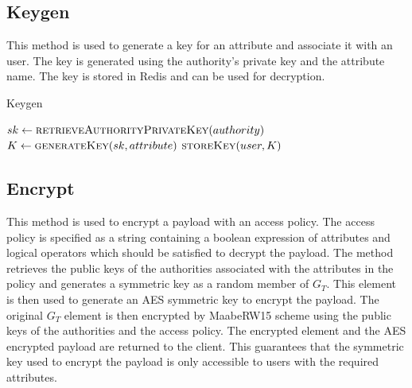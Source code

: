 \documentclass[cic,tc,english]{iiufrgs}
\begin{document}
        \subsection{Keygen}
            This method is used to generate a key for an attribute and associate it with an user. The key is generated using the authority's private key and the attribute name. The key is stored in Redis and can be used for decryption.

            \begin{algorithm}
                \caption{Keygen}
                \label{alg:keygen}
                \begin{algorithmic}[1]
                    \State $sk \gets \textsc{retrieveAuthorityPrivateKey}(authority)$
                    \State $K \gets \textsc{generateKey}(sk, attribute)$
                    \State $\textsc{storeKey}(user, K)$
                \EndProcedure
                \end{algorithmic}
            \end{algorithm}


        \subsection{Encrypt}
            This method is used to encrypt a payload with an access policy. The access policy is specified as a string containing a boolean expression of attributes and logical operators which should be satisfied to decrypt the payload. The method retrieves the public keys of the authorities associated with the attributes in the policy and generates a symmetric key as a random member of $G_T$. This element is then used to generate an AES symmetric key to encrypt the payload. The original $G_T$ element is then encrypted by MaabeRW15 scheme using the public keys of the authorities and the access policy. The encrypted element and the AES encrypted payload are returned to the client. This guarantees that the symmetric key used to encrypt the payload is only accessible to users with the required attributes.
\end{document}
